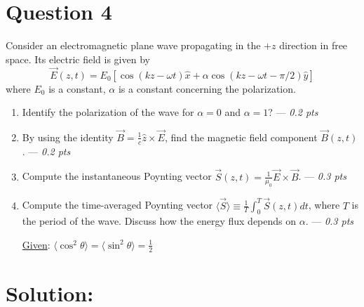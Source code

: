 \section*{Question 4}
Consider an electromagnetic plane wave propagating in the $+z$ direction in free space. Its electric field is given by
\[
\vec{E}(z,t) = E_0 \left[ \cos(kz-\omega t) \hat{x} + \alpha \cos(kz - \omega t - \pi/2) \hat{y}\right]
\]
where $E_0$ is a constant, $\alpha$ is a constant concerning the polarization.
\begin{enumerate}
    \item [(a)] Identify the polarization of the wave for $\alpha = 0$ and $\alpha = 1$? --- \textit{0.2 pts}
    \item[(b)] By using the identity $\vec{B}=\frac{1}{c}\hat{z}\times\vec{E}$, find the magnetic field component $\vec{B}(z,t)$. --- \textit{0.2 pts}
    \item[(c)] Compute the instantaneous Poynting vector $\vec{S}(z,t)=\frac{1}{\mu_0} \vec{E} \times \vec{B}$. --- \textit{0.3 pts}
    \item[(d)] Compute the time-averaged Poynting vector $\langle \vec{S} \rangle \equiv \frac{1}{T} \int_0^T \vec{S}(z,t) dt$, where $T$ is the period of the wave. Discuss how the energy flux depends on $\alpha$. --- \textit{0.3 pts}
    
    \underline{Given}: $\langle \cos^2\theta \rangle = \langle \sin^2\theta \rangle = \frac{1}{2}$ 
\end{enumerate}

 \section*{Solution:}

